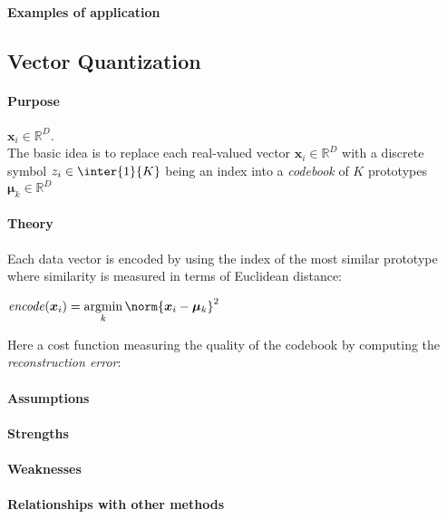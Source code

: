 \paragraph{Examples of application}


\subsection{Vector Quantization}
\paragraph{Purpose}
$\bm{x}_{i}\in\mathbb{R}^{D}$.\\
The basic idea is to replace each real-valued vector $\bm{x}_{i}\in\mathbb{R}^{D}$ with a discrete
symbol $z_{i}\in\inter{1}{K}$ being an index into a \emph{codebook} of $K$ prototypes $\bm{\mu}_{k}
\in\mathbb{R}^{D}$
\paragraph{Theory}
Each data vector is encoded by using the index of the most similar prototype where similarity is
measured in terms of Euclidean distance:
\begin{center}
    $\text{\emph{encode}}(\bm{x}_{i}) = \displaystyle\argmin_{k}\norm{\bm{x}_{i}-\bm{\mu}_{k}}^{2}$
\end{center}
Here a cost function measuring the quality of the codebook by computing the \emph{reconstruction
error}:
\begin{center}
\end{center}

\paragraph{Assumptions}
\paragraph{Strengths}
\paragraph{Weaknesses}
\paragraph{Relationships with other methods}
